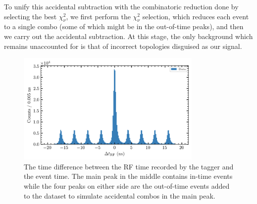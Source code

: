 To unify this accidental subtraction with the combinatoric reduction done by selecting the best $\chi^2_\nu$, we first perform the $\chi^2_\nu$ selection, which reduces each event to a single combo (some of which might be in the out-of-time peaks), and then we carry out the accidental subtraction. At this stage, the only background which remains unaccounted for is that of incorrect topologies disguised as our signal.

\begin{figure}
  \begin{center}
    \includegraphics[width=0.8\textwidth]{figures/data_original_RF_chisqdof_3.4_protonz.png}
  \end{center}
  \caption{The time difference between the RF time recorded by the tagger and the event time. The main peak in the middle contains in-time events while the four peaks on either side are the out-of-time events added to the dataset to simulate accidental combos in the main peak.}\label{fig:delta-t-rf}
\end{figure}
